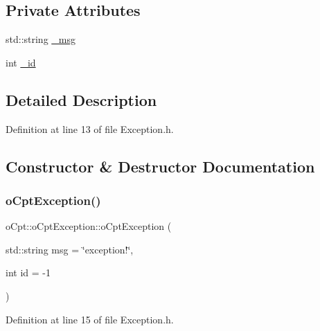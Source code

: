 \subsection*{Private Attributes}
\begin{DoxyCompactItemize}
\item 
std\+::string \hyperlink{classo_cpt_1_1o_cpt_exception_a7d20b46357532fcde0c6f4614c636786}{\+\_\+msg}
\item 
int \hyperlink{classo_cpt_1_1o_cpt_exception_a9d4c556dda3f8143c9aeef2817ee254c}{\+\_\+id}
\end{DoxyCompactItemize}


\subsection{Detailed Description}


Definition at line 13 of file Exception.\+h.



\subsection{Constructor \& Destructor Documentation}
\hypertarget{classo_cpt_1_1o_cpt_exception_a208458b2a2bf67fc8ca289b469e59cdf}{}\label{classo_cpt_1_1o_cpt_exception_a208458b2a2bf67fc8ca289b469e59cdf} 
\subsubsection{\texorpdfstring{o\+Cpt\+Exception()}{oCptException()}}
{\footnotesize\ttfamily o\+Cpt\+::o\+Cpt\+Exception\+::o\+Cpt\+Exception (\begin{DoxyParamCaption}\item[{std\+::string}]{msg = {\ttfamily \char`\"{}exception!\char`\"{}},  }\item[{int}]{id = {\ttfamily -\/1} }\end{DoxyParamCaption})\hspace{0.3cm}{\ttfamily [inline]}}



Definition at line 15 of file Exception.\+h.

\hypertarget{classo_cpt_1_1o_cpt_exception_a4083ed2718d9bdf097874c98aab69804}{}\label{classo_cpt_1_1o_cpt_exception_a4083ed2718d9bdf097874c98aab69804} 
